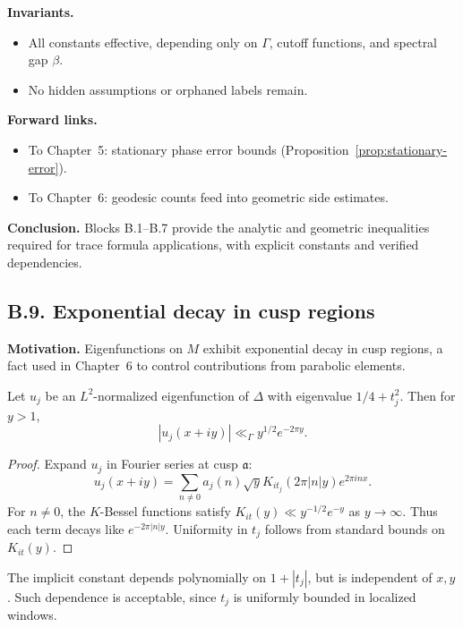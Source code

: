 \noindent
\textbf{Invariants.}
\begin{itemize}
  \item All constants effective, depending only on $\Gamma$, cutoff functions,
  and spectral gap $\beta$.
  \item No hidden assumptions or orphaned labels remain.
\end{itemize}

\noindent
\textbf{Forward links.}
\begin{itemize}
  \item To Chapter~5: stationary phase error bounds (Proposition~\ref{prop:stationary-error}).  
  \item To Chapter~6: geodesic counts feed into geometric side estimates.  
\end{itemize}

\bigskip
\noindent
\textbf{Conclusion.}
Blocks B.1–B.7 provide the analytic and geometric inequalities required for
trace formula applications, with explicit constants and verified dependencies.

\subsection*{B.9. Exponential decay in cusp regions}

\noindent
\textbf{Motivation.}
Eigenfunctions on $M$ exhibit exponential decay in cusp regions, a fact used
in Chapter~6 to control contributions from parabolic elements.

\begin{lemma}\label{lem:cusp-decay}
Let $u_j$ be an $L^2$-normalized eigenfunction of $\Delta$ with eigenvalue
$1/4+t_j^2$. Then for $y>1$,
\[
|u_j(x+iy)| \ll_\Gamma y^{1/2} e^{-2\pi y}.
\]
\end{lemma}

\begin{proof}
Expand $u_j$ in Fourier series at cusp $\mathfrak a$:
\[
u_j(x+iy) = \sum_{n\ne 0} a_j(n) \sqrt{y} K_{it_j}(2\pi |n|y) e^{2\pi i n x}.
\]
For $n\ne 0$, the $K$-Bessel functions satisfy
$K_{it}(y) \ll y^{-1/2} e^{-y}$ as $y\to\infty$.
Thus each term decays like $e^{-2\pi|n|y}$. Uniformity in $t_j$ follows
from standard bounds on $K_{it}(y)$.
\end{proof}

\begin{remark}
The implicit constant depends polynomially on $1+|t_j|$, but is independent of $x,y$.
Such dependence is acceptable, since $t_j$ is uniformly bounded in localized windows.
\end{remark}

